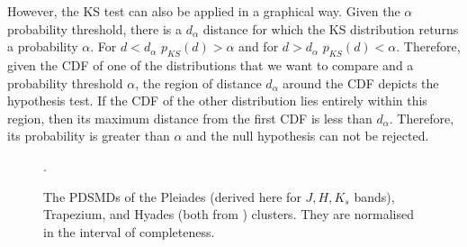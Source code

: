 However, the KS test can also be applied in a graphical way. Given the $\alpha$ probability threshold, there is a $d_{\alpha}$ distance for which the KS distribution returns a probability $\alpha$. For $d < d_{\alpha}$ $p_{KS}(d) > \alpha$ and for $d > d_{\alpha}$ $p_{KS}(d) < \alpha$. Therefore, given the CDF of one of the distributions that we want to compare and a probability threshold $\alpha$, the region of distance $d_{\alpha}$ around the CDF depicts the hypothesis test. If the CDF of the other distribution lies entirely within this region, then its maximum distance from the first CDF is less than $d_{\alpha}$. Therefore, its probability is greater than $\alpha$ and the null hypothesis can not be rejected.

\begin{figure}[htp]
\begin{center}
\caption{The PDSMDs of the Pleiades (derived here for $J,H,K_s$ bands), Trapezium, and Hyades (both from \citet{Bouy2015}) clusters. They are normalised in the interval of completeness.}
\label{fig:PDSMDcomparison}.
\end{center}
\end{figure}

